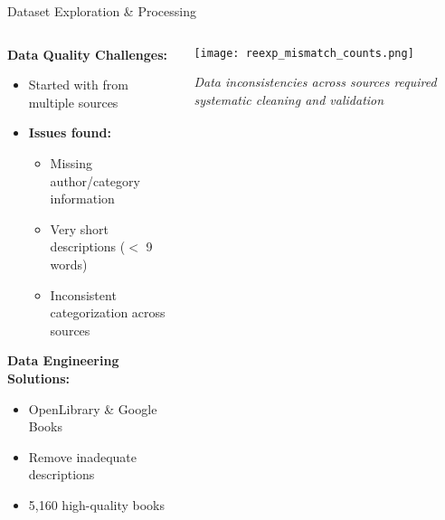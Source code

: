 \begin{frame}{Dataset Exploration \& Processing}
  
\begin{columns}[T]
  \begin{column}{0.55\textwidth}
	\textbf{Data Quality Challenges:}
	\begin{itemize}
	  \item Started with  from multiple sources
	  \item \textbf{Issues found:}
		\begin{itemize}
		  \item Missing author/category information
		  \item Very short descriptions ($<$ 9 words)
		  \item Inconsistent categorization across sources
		\end{itemize}
	\end{itemize}
	
	\vspace{0.3cm}
	\textbf{Data Engineering Solutions:}
	\begin{itemize}
	  \item {} OpenLibrary \& Google Books
	  \item {} Remove inadequate descriptions
	  \item {} 5,160 high-quality books
	\end{itemize}
  \end{column}

  \begin{column}{0.4\textwidth}
	\centering
	\texttt{[image: reexp\_mismatch\_counts.png]}
	
	\vspace{0.2cm}
	\scriptsize \textit{Data inconsistencies across sources required systematic cleaning and validation}
  \end{column}
\end{columns}

\end{frame}

